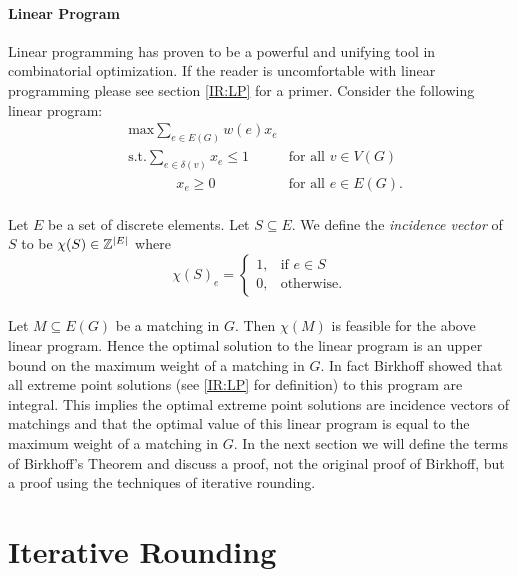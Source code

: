 \paragraph{Linear Program}
Linear programming has proven to be a powerful and unifying tool in combinatorial optimization. If the reader is uncomfortable with linear programming please see section \ref{IR:LP} for a primer. Consider the following linear program:
\begin{align*}
	&\text{max} \sum_{e \in E(G)} w(e) x_e \\
	&\text{s.t.} \sum_{e \in \delta(v)} x_e \leq 1 &\text{for all $v \in V(G)$} \\
	&\quad\quad\quad\ \ x_e \geq 0 &\text{for all $e \in E(G)$.}
\end{align*}
\paragraph{} Let $E$ be a set of discrete elements. Let $S \subseteq E$. We define the {\it incidence vector} of $S$ to be $\chi(S) \in \mathbb{Z}^{|E|}$ where 
$$ \chi(S)_e = \begin{cases}
1, &\text{if $e \in S$ } \\
0, &\text{otherwise.}
\end{cases}$$

\paragraph{}
Let $M\subseteq E(G)$ be a matching in $G$. Then $\chi(M)$ is feasible for the above linear program. Hence the optimal solution to the linear program is an upper bound on the maximum weight of a matching in $G$. In fact Birkhoff \cite{birkhoff1946tres} showed that all extreme point solutions (see \ref{IR:LP} for definition) to this program are integral. This implies the optimal extreme point solutions are incidence vectors of matchings and that the optimal value of this linear program is equal to the maximum weight of a matching in $G$. In the next section we will define the terms of Birkhoff's Theorem and discuss a proof, not the original proof of Birkhoff, but a proof using the techniques of iterative rounding.
\section{Iterative Rounding}\label{IR}
